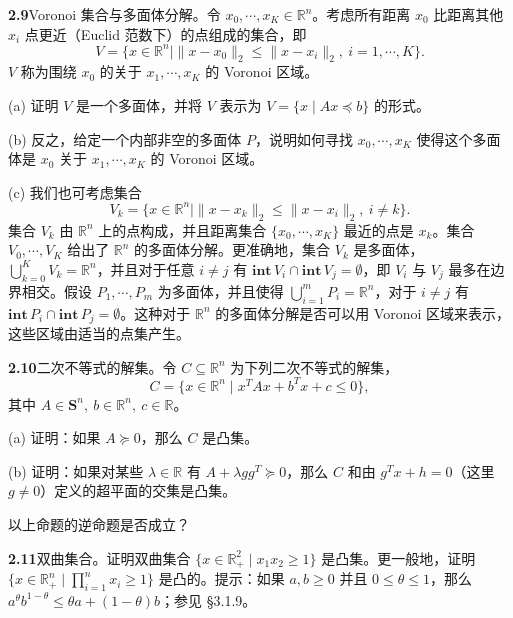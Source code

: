 \documentclass[UTF8,12pt,a4paper,fontset=fandol]{ctexart}
\begin{document}
\noindent\textbf{2.9}\quad Voronoi 集合与多面体分解。令 $x_0,\cdots,x_K\in\mathbb{R}^n$。考虑所有距离 $x_0$ 比距离其他 $x_i$ 点更近（Euclid 范数下）的点组成的集合，即
\[
  V=\{x\in\mathbb{R}^n\mid \|x-x_0\|_2\le\|x-x_i\|_2,\ i=1,\cdots,K\}.
\]
$V$ 称为围绕 $x_0$ 的关于 $x_1,\cdots,x_K$ 的 Voronoi 区域。

\noindent(a) 证明 $V$ 是一个多面体，并将 $V$ 表示为 $V=\{x\mid Ax\preceq b\}$ 的形式。

\noindent(b) 反之，给定一个内部非空的多面体 $P$，说明如何寻找 $x_0,\cdots,x_K$ 使得这个多面体是 $x_0$ 关于 $x_1,\cdots,x_K$ 的 Voronoi 区域。

\noindent(c) 我们也可考虑集合
\[
  V_k=\{x\in\mathbb{R}^n\mid \|x-x_k\|_2\le\|x-x_i\|_2,\ i\ne k\}.
\]
集合 $V_k$ 由 $\mathbb{R}^n$ 上的点构成，并且距离集合 $\{x_0,\cdots,x_K\}$ 最近的点是 $x_k$。集合 $V_0,\cdots,V_K$ 给出了 $\mathbb{R}^n$ 的多面体分解。更准确地，集合 $V_k$ 是多面体，$\bigcup_{k=0}^K V_k=\mathbb{R}^n$，并且对于任意 $i\ne j$ 有 $\mathbf{int}\,V_i\cap\mathbf{int}\,V_j=\emptyset$，即 $V_i$ 与 $V_j$ 最多在边界相交。假设 $P_1,\cdots,P_m$ 为多面体，并且使得 $\bigcup_{i=1}^m P_i=\mathbb{R}^n$，对于 $i\ne j$ 有 $\mathbf{int}\,P_i\cap\mathbf{int}\,P_j=\emptyset$。这种对于 $\mathbb{R}^n$ 的多面体分解是否可以用 Voronoi 区域来表示，这些区域由适当的点集产生。

\noindent\textbf{2.10}\quad 二次不等式的解集。令 $C\subseteq\mathbb{R}^n$ 为下列二次不等式的解集，
\[
  C=\{x\in\mathbb{R}^n\mid x^TAx+b^Tx+c\le0\},
\]
其中 $A\in\mathbf{S}^n,\ b\in\mathbb{R}^n,\ c\in\mathbb{R}$。

\noindent(a) 证明：如果 $A\succeq0$，那么 $C$ 是凸集。

\noindent(b) 证明：如果对某些 $\lambda\in\mathbb{R}$ 有 $A+\lambda gg^T\succeq0$，那么 $C$ 和由 $g^Tx+h=0$（这里 $g\ne0$）定义的超平面的交集是凸集。

以上命题的逆命题是否成立？

\noindent\textbf{2.11}\quad 双曲集合。证明双曲集合 $\{x\in\mathbb{R}_+^2\mid x_1x_2\ge1\}$ 是凸集。更一般地，证明 $\{x\in\mathbb{R}_+^n\mid \prod_{i=1}^n x_i\ge1\}$ 是凸的。提示：如果 $a,b\ge0$ 并且 $0\le\theta\le1$，那么 $a^\theta b^{1-\theta}\le\theta a+(1-\theta)b$；参见 \S3.1.9。
\end{document}
